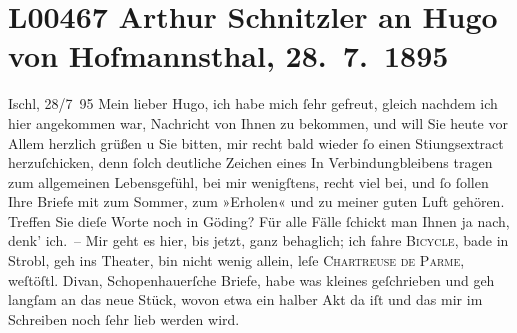 

\section[Arthur Schnitzler an Hugo von Hofmannsthal, 28. 7. 1895]{L00467 Arthur Schnitzler an Hugo von Hofmannsthal, 28. 7. 1895}
\nopagebreak{}
\rehead{ }\normalsize\beginnumbering{}
\toendnotes[C]{\smallbreak\pagebreak[2]}
\toendnotes[C]{\smallbreak}
\pstart
           \raggedleft{}{\pb}Ischl, 28/7 95\pend
           \vspace{0.5em}
\pstart
           Mein lieber Hugo, ich habe mich ſehr gefreut, gleich nachdem ich
               hier angekommen war, Nachricht von Ihnen zu bekommen, und will Sie heute vor Allem
               herzlich grüßen u Sie bitten, mir recht bald wieder ſo einen Sti{\geminationm}ungsextract herzuſchicken, denn ſolch deutliche Zeichen
               eines In Verbindungbleibens tragen zum allgemeinen Lebensgefühl, bei mir wenigſtens,
               recht viel bei, und ſo ſollen {\pb}Ihre Briefe mit zum
               Sommer, zum »Erholen« und zu meiner guten Luft gehören. Treffen Sie dieſe Worte noch
               in Göding? Für alle Fälle ſchickt man Ihnen ja
               nach, denk’ ich. – Mir geht es hier, bis jetzt, ganz behaglich; ich fahre \textsc{Bicycle}, bade in Strobl,
               geh ins Theater, bin nicht wenig allein, leſe \textsc{Chartreuse de Parme}, weſtöſtl. Divan, Schopenhauerſche Briefe,
               habe was kleines geſchrieben
               und geh langſam an das neue Stück, wovon etwa ein halber Akt da iſt und das mir im Schreiben noch ſehr
               lieb werden wird.\pend
           

